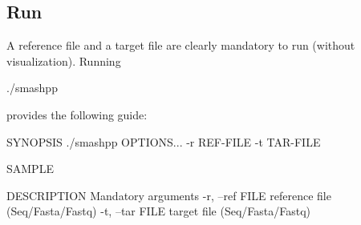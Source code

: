 \subsection{Run}
A reference file and a target file are clearly mandatory to run \smashpp (without visualization). Running
\begin{code}[style=bash]
./smashpp
\end{code}
provides the following guide:
\begin{code}[style=bash]
SYNOPSIS                                                       
  ./smashpp  OPTIONS...  -r REF-FILE  -t TAR-FILE              
                                                               
SAMPLE                                                         
                                                               
DESCRIPTION                                                    
  Mandatory arguments                                          
  -r,  --ref FILE            reference file (Seq/Fasta/Fastq)  
  -t,  --tar FILE            target file    (Seq/Fasta/Fastq)  
                                                               

\end{code}

